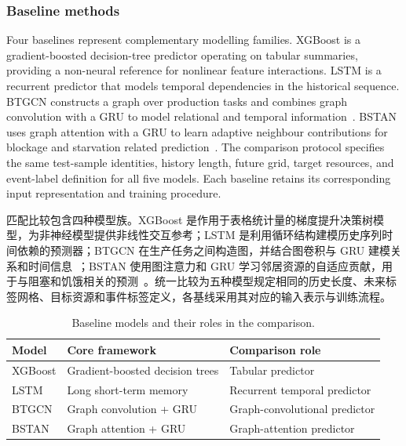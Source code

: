\documentclass[a4paper,fleqn]{cas-dc}
\newcommand{\zhpara}[1]{%
  \par\begingroup\small\color{black!72}\noindent #1\par\endgroup}
\begin{document}
\subsubsection{Baseline methods}

Four baselines represent complementary modelling families. XGBoost is a gradient-boosted decision-tree predictor operating on tabular summaries, providing a non-neural reference for nonlinear feature interactions. LSTM is a recurrent predictor that models temporal dependencies in the historical sequence. BTGCN constructs a graph over production tasks and combines graph convolution with a GRU to model relational and temporal information~\cite{yin2025btgcn}. BSTAN uses graph attention with a GRU to learn adaptive neighbour contributions for blockage and starvation related prediction~\cite{lai2023bstan}. The comparison protocol specifies the same test-sample identities, history length, future grid, target resources, and event-label definition for all five models. Each baseline retains its corresponding input representation and training procedure.

\zhpara{匹配比较包含四种模型族。XGBoost 是作用于表格统计量的梯度提升决策树模型，为非神经模型提供非线性交互参考；LSTM 是利用循环结构建模历史序列时间依赖的预测器；BTGCN 在生产任务之间构造图，并结合图卷积与 GRU 建模关系和时间信息~\cite{yin2025btgcn}；BSTAN 使用图注意力和 GRU 学习邻居资源的自适应贡献，用于与阻塞和饥饿相关的预测~\cite{lai2023bstan}。统一比较为五种模型规定相同的历史长度、未来标签网格、目标资源和事件标签定义，各基线采用其对应的输入表示与训练流程。}

\begin{table}[t]
\centering
\caption{Baseline models and their roles in the comparison.}
\label{tab:exp-baselines}
\scriptsize
\setlength{\tabcolsep}{4pt}
\renewcommand{\arraystretch}{1.10}
\begin{tabularx}{\columnwidth}{@{}lXX@{}}
\toprule
Model & Core framework & Comparison role \\
\midrule
XGBoost & Gradient-boosted decision trees & Tabular predictor \\
LSTM & Long short-term memory & Recurrent temporal predictor \\
BTGCN & Graph convolution + GRU & Graph-convolutional predictor \\
BSTAN & Graph attention + GRU & Graph-attention predictor \\
\bottomrule
\end{tabularx}
\end{table}
\end{document}
